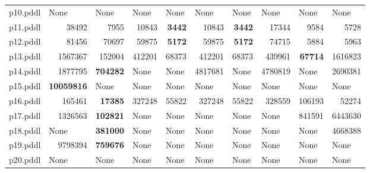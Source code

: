 \documentclass{article}
\begin{document}
\begin{tabular}{@{}lrrrrrrrrr@{}}
p10.pddl & \multicolumn{1}{|l|}{None} & \multicolumn{1}{|l|}{None} & \multicolumn{1}{|l|}{None} & \multicolumn{1}{|l|}{None} & \multicolumn{1}{|l|}{None} & \multicolumn{1}{|l|}{None} & \multicolumn{1}{|l|}{None} & \multicolumn{1}{|l|}{None} & \multicolumn{1}{|l|}{None} \\
p11.pddl & 38492 & 7955 & 10843 & \textbf{3442} & 10843 & \textbf{3442} & 17344 & 9584 & 5728 \\
p12.pddl & 81456 & 70697 & 59875 & \textbf{5172} & 59875 & \textbf{5172} & 74715 & 5884 & 5963 \\
p13.pddl & 1567367 & 152004 & 412201 & 68373 & 412201 & 68373 & 439961 & \textbf{67714} & 1616823 \\
p14.pddl & 1877795 & \textbf{704282} & \multicolumn{1}{|l|}{None} & \multicolumn{1}{|l|}{None} & 4817681 & \multicolumn{1}{|l|}{None} & 4780819 & \multicolumn{1}{|l|}{None} & 2690381 \\
p15.pddl & \textbf{10059816} & \multicolumn{1}{|l|}{None} & \multicolumn{1}{|l|}{None} & \multicolumn{1}{|l|}{None} & \multicolumn{1}{|l|}{None} & \multicolumn{1}{|l|}{None} & \multicolumn{1}{|l|}{None} & \multicolumn{1}{|l|}{None} & \multicolumn{1}{|l|}{None} \\
p16.pddl & 165461 & \textbf{17385} & 327248 & 55822 & 327248 & 55822 & 328559 & 106193 & 52274 \\
p17.pddl & 1326563 & \textbf{102821} & \multicolumn{1}{|l|}{None} & \multicolumn{1}{|l|}{None} & \multicolumn{1}{|l|}{None} & \multicolumn{1}{|l|}{None} & \multicolumn{1}{|l|}{None} & 841591 & 6443630 \\
p18.pddl & \multicolumn{1}{|l|}{None} & \textbf{381000} & \multicolumn{1}{|l|}{None} & \multicolumn{1}{|l|}{None} & \multicolumn{1}{|l|}{None} & \multicolumn{1}{|l|}{None} & \multicolumn{1}{|l|}{None} & \multicolumn{1}{|l|}{None} & 4668388 \\
p19.pddl & 9798394 & \textbf{759676} & \multicolumn{1}{|l|}{None} & \multicolumn{1}{|l|}{None} & \multicolumn{1}{|l|}{None} & \multicolumn{1}{|l|}{None} & \multicolumn{1}{|l|}{None} & \multicolumn{1}{|l|}{None} & \multicolumn{1}{|l|}{None} \\
p20.pddl & \multicolumn{1}{|l|}{None} & \multicolumn{1}{|l|}{None} & \multicolumn{1}{|l|}{None} & \multicolumn{1}{|l|}{None} & \multicolumn{1}{|l|}{None} & \multicolumn{1}{|l|}{None} & \multicolumn{1}{|l|}{None} & \multicolumn{1}{|l|}{None} & \multicolumn{1}{|l|}{None} \\
\end{tabular}
\end{document}
